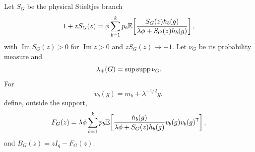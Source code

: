 \documentclass[
  aps,
  prl,
  10pt,
  onecolumn,
  longbibliography,
  nofootinbib
]{revtex4-2}
\theoremstyle{remark}
\begin{document}
Let $S_G$ be the physical Stieltjes branch
\begin{equation}
1+zS_G(z)=
\phi\sum_{b=1}^kp_b
\mathbb{E}\!\left[
\frac{S_G(z)h_b(g)}
{\lambda\phi+S_G(z)h_b(g)}
\right],
\label{S:fixedpoint}
\end{equation}
with $\operatorname{Im}S_G(z)>0$ for $\operatorname{Im}z>0$ and
$zS_G(z)\to-1$. Let $\nu_G$ be its probability measure and
\begin{equation}
\lambda_+(G)=\sup\operatorname{supp}\nu_G.
\end{equation}
For
\begin{equation}
v_b(g)=m_b+\lambda^{-1/2}g,
\end{equation}
define, outside the support,
\begin{equation}
F_G(z)=
\lambda\phi\sum_{b=1}^kp_b
\mathbb{E}\!\left[
\frac{h_b(g)}
{\lambda\phi+S_G(z)h_b(g)}
v_b(g)v_b(g)^{\mathsf T}
\right],
\label{S:F}
\end{equation}
and $B_G(z)=zI_q-F_G(z)$.
\end{document}
